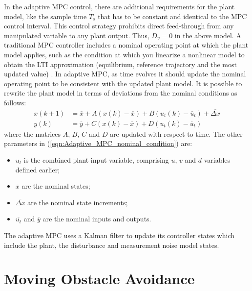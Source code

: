 \documentclass[conference,11pt]{IEEEtran}
\renewcommand{\vec}[1]{\ensuremath{\boldsymbol{\mathit{#1}}}}
\begin{document}
In the adaptive MPC control, there are additional requirements for the plant model, like the sample time $T_s$ that has to be constant and identical to the MPC control interval. This control strategy prohibits direct feed-through from any manipulated variable to any plant output. Thus, $\vec{D_v} = \vec{0}$ in the above model.
A traditional MPC controller includes a nominal operating point at which the plant model applies, such as the condition at which you linearize a nonlinear model to obtain the LTI approximation (equilibrium, reference trajectory and the	
most updated value) \cite{mpctoolbox}. In adaptive MPC, as time evolves it should update the nominal operating point to be consistent with the updated plant model. It is possible to rewrite the plant model in terms of deviations from the nominal conditions as follows:
\begin{equation}
\label{eqn:Adaptive_MPC_nominal_condition}
\begin{aligned}
\vec{x}(k+1)&=\overline{\vec{x}}+\vec{A}(\vec{x}(k)-\overline{\vec{x}})+ \vec{B}(\vec{u}_t(k)-\overline{\vec{u}}_t)+\overline{\Delta \vec{x}} \\
\vec{y}(k)&=\overline{\vec{y}}+\vec{C}(\vec{x}(k)-\overline{\vec{x}}) + \vec{D}(\vec{u}_t(k)-\overline{\vec{u}}_t)
\end{aligned}
\end{equation}
where the matrices \vec{A}, \vec{B}, \vec{C} and \vec{D} are updated with respect to time. The other parameters in (\ref{eqn:Adaptive_MPC_nominal_condition}) are:
\begin{itemize}
	\item $\vec{u}_t$ is the combined plant input variable, comprising $\vec{u}$, $\vec{v}$ and $\vec{d}$ variables defined earlier;
	\item $\overline{\vec{x}}$ are the nominal states;
	\item $\overline{\Delta \vec{x}}$ are the nominal state increments;
	\item $\overline{\vec{u}_t}$ and $\overline{\vec{y}}$ are the nominal inputs and outputs.
\end{itemize} 
The adaptive MPC uses a Kalman filter to update its controller states which include the plant, the disturbance and measurement noise model states.
\section{Moving Obstacle Avoidance}
\end{document}
